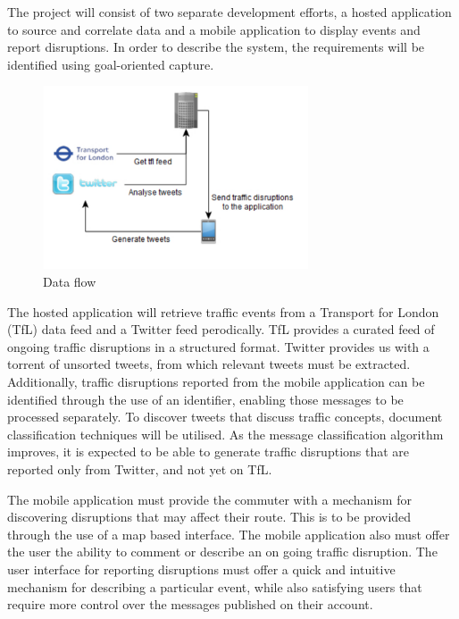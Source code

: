 The project will consist of two separate development efforts, a
hosted application to source and correlate data and a mobile application to
display events and report disruptions. In order to describe the system, the
requirements will be identified using goal-oriented capture\cite{Requirements}.

\begin{figure}[here]
\begin{center}
\includegraphics[width=0.7\textwidth]{images/draft_architecture.pdf}
\end{center}
\vspace{-20pt}
\caption{Data flow}
\end{figure}

The hosted application will retrieve traffic events from a Transport for London
(TfL) data feed and a Twitter feed perodically. TfL provides a curated feed of
ongoing traffic disruptions in a structured format. Twitter provides us with a
torrent of unsorted tweets, from which relevant tweets must be extracted. 
Additionally, traffic disruptions reported from the mobile application can be
identified through the use of an identifier, enabling those messages to be
processed separately. To discover tweets that discuss traffic concepts,
document classification techniques will be utilised. As the message
classification algorithm improves, it is expected to be able to generate 
traffic disruptions that are reported only from Twitter, and not yet on TfL.

The mobile application must provide the commuter with a mechanism for discovering disruptions that may affect their route. This is to be provided through the use of a map based interface. The mobile application also must offer the user the ability to comment or describe an on going traffic disruption. The user interface for reporting disruptions must offer a quick and intuitive mechanism for describing a particular event, while also satisfying users that require more control over the messages published on their account.

